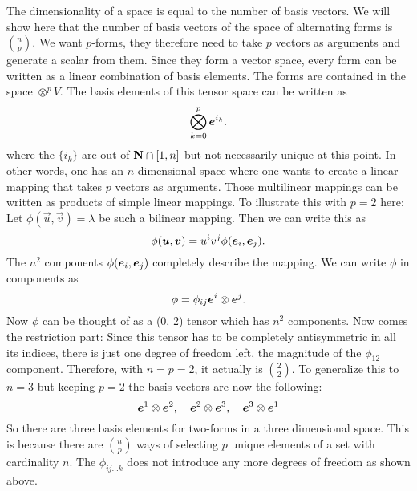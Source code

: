 \documentclass[11pt, english, fleqn, DIV=15, headinclude, BCOR=1cm]{scrartcl}
\begin{document}
The dimensionality of a space is equal to the number of basis vectors. We will
show here that the number of basis vectors of the space of alternating forms is
$\binom np$. We want $p$-forms, they therefore need to take $p$ vectors as
arguments and generate a scalar from them. Since they form a vector space,
every form can be written as a linear combination of basis elements. The forms
are contained in the space $\otimes^p V$. The basis elements of this tensor
space can be
written as
\[
    \bigotimes_{k=0}^p \boldsymbol{e}^{i_k}.
\]
where the $\{i_k\}$ are out of $\mathbf N \cap [1, n]$ but not necessarily unique at
this point. In other words, one has an $n$-dimensional space where one wants to
create a linear mapping that takes $p$ vectors as arguments. Those multilinear
mappings can be written as products of simple linear mappings. To illustrate
this with $p = 2$ here: Let $\phi(\vec u, \vec v) = \lambda$ be such a bilinear
mapping. Then we can write this as
\[
    \phi(\boldsymbol{u}, \boldsymbol{v}) = u^i v^j \phi(\boldsymbol{e}_i, \boldsymbol{e}_j).
\]
The $n^2$ components $\phi(\boldsymbol{e}_i, \boldsymbol{e}_j)$ completely describe the mapping. We
can write $\phi$ in components as
\[
    \phi = \phi_{ij} \boldsymbol{e}^i \otimes \boldsymbol{e}^j.
\]
Now $\phi$ can be thought of as a (0, 2) tensor which has $n^2$ components. Now
comes the restriction part: Since this tensor has to be completely
antisymmetric in all its indices, there is just one degree of freedom left, the
magnitude of the $\phi_{12}$ component. Therefore, with $n = p = 2$, it
actually is $\binom 22$. To generalize this to $n = 3$ but keeping $p = 2$ the
basis vectors are now the following:
\[
    \boldsymbol{e}^1 \otimes \boldsymbol{e}^2
    ,\quad
    \boldsymbol{e}^2 \otimes \boldsymbol{e}^3
    ,\quad
    \boldsymbol{e}^3 \otimes \boldsymbol{e}^1
\]
So there are three basis elements for two-forms in a three dimensional space.
This is because there are $\binom np$ ways of selecting $p$ unique elements of
a set with cardinality $n$. The $\phi_{ij\ldots k}$ does not introduce any more
degrees of freedom as shown above.
\end{document}
